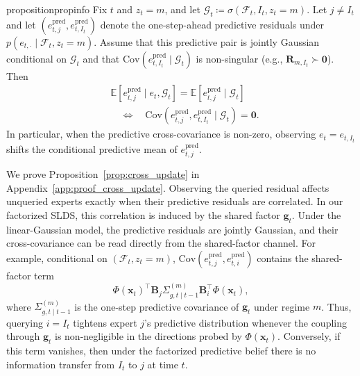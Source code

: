 \begin{restatable}{proposition}{propinfo}
\label{prop:cross_update}
Fix \(t\) and \(z_t=m\), and let \(\mathcal{G}_t\coloneqq \sigma(\mathcal{F}_t,I_t,z_t=m)\). Let
\(j\neq I_t\) and let \((e_{t,j}^{\mathrm{pred}},e_{t,I_t}^{\mathrm{pred}})\) denote the one-step-ahead
predictive residuals under \(p(e_{t,\cdot}\mid \mathcal{F}_t,z_t=m)\). Assume that this predictive pair
is jointly Gaussian conditional on \(\mathcal{G}_t\) and that
\(\mathrm{Cov}(e_{t,I_t}^{\mathrm{pred}}\mid \mathcal{G}_t)\) is non-singular (e.g.,
\(\mathbf{R}_{m,I_t}\succ \mathbf{0}\)). Then
\begin{equation*}
    \begin{aligned}
        & \mathbb{E}\left[e_{t,j}^{\mathrm{pred}}\mid e_t,\mathcal{G}_t\right]
=
\mathbb{E}\left[e_{t,j}^{\mathrm{pred}}\mid \mathcal{G}_t\right] \\
& \quad\Longleftrightarrow\quad
\mathrm{Cov}\left(e_{t,j}^{\mathrm{pred}},e_{t,I_t}^{\mathrm{pred}}\mid \mathcal{G}_t\right)=\mathbf{0}.
    \end{aligned}
\end{equation*}
In particular, when the predictive cross-covariance is non-zero, observing \(e_t=e_{t,I_t}\) shifts
the conditional predictive mean of \(e_{t,j}^{\mathrm{pred}}\).
\end{restatable}

We prove Proposition~\ref{prop:cross_update} in Appendix~\ref{app:proof_cross_update}. Observing the queried
residual affects unqueried experts exactly when their predictive
residuals are correlated. In our factorized SLDS, this correlation is induced by the shared factor
\(\mathbf{g}_t\). Under the linear-Gaussian model, the predictive residuals are jointly Gaussian, and
their cross-covariance can be read directly from the shared-factor channel. For example, conditional on
\((\mathcal{F}_t,z_t=m)\),
\(\mathrm{Cov}(e_{t,j}^{\mathrm{pred}},e_{t,i}^{\mathrm{pred}})\) contains the shared-factor term
\[
\Phi(\mathbf{x}_t)^\top \mathbf{B}_j \Sigma^{(m)}_{g,t\mid t-1}\mathbf{B}_{i}^\top \Phi(\mathbf{x}_t),
\]
where \(\Sigma^{(m)}_{g,t\mid t-1}\) is the one-step predictive covariance of \(\mathbf{g}_t\)
under regime \(m\). Thus, querying \(i=I_t\) tightens expert \(j\)'s predictive distribution whenever
the coupling through \(\mathbf{g}_t\) is non-negligible in the directions probed by \(\Phi(\mathbf{x}_t)\).
Conversely, if this term vanishes, then under the
factorized predictive belief there is no information transfer from \(I_t\) to \(j\) at time \(t\).

